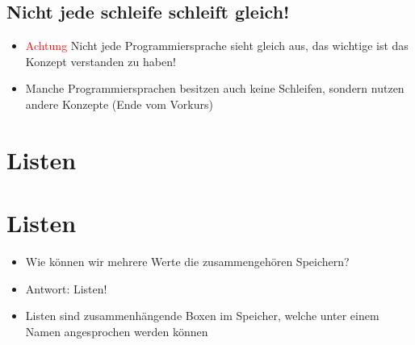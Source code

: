 \livecoding

\subsection{Nicht jede schleife schleift gleich!}
\begin{frame}
    \slidehead

    \begin{itemize}
        \item \textcolor{red}{Achtung} Nicht jede Programmiersprache sieht gleich aus, das wichtige ist das Konzept verstanden zu haben!
        \item Manche Programmiersprachen besitzen auch keine Schleifen, sondern nutzen andere Konzepte (Ende vom Vorkurs)
    \end{itemize}
\end{frame}

\section{Listen}
\begin{frame}
    \slidehead

    \begin{center}
    \label{fig:figure}
    \end{center}

\end{frame}

\livecoding

\section{Listen}
\begin{frame}
    \slidehead
    \begin{itemize}
        \item Wie können wir mehrere Werte die zusammengehören Speichern?
        \item Antwort: Listen!
        \item Listen sind zusammenhängende Boxen im Speicher, welche unter einem Namen angesprochen werden können
    \end{itemize}
\end{frame}


